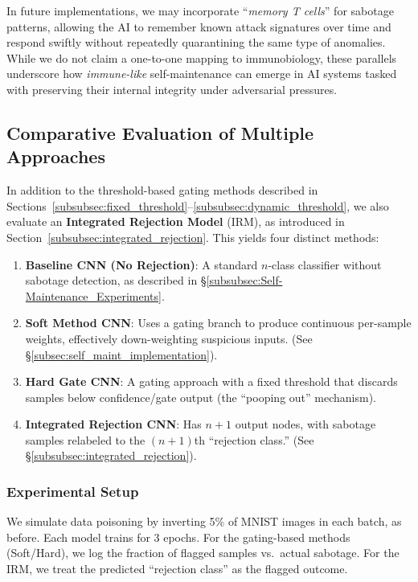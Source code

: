 \documentclass[12pt]{article}
\begin{document}
In future implementations, we may incorporate “\emph{memory T cells}” for sabotage
patterns, allowing the AI to remember known attack signatures over time and respond
swiftly without repeatedly quarantining the same type of anomalies. While we do not
claim a one-to-one mapping to immunobiology, these parallels underscore how
\emph{immune-like} self-maintenance can emerge in AI systems tasked with preserving
their internal integrity under adversarial pressures.

\subsection{Comparative Evaluation of Multiple Approaches}
\label{subsec:comparative_evaluation}

In addition to the threshold-based gating methods described in
Sections~\ref{subsubsec:fixed_threshold}--\ref{subsubsec:dynamic_threshold},
we also evaluate an \textbf{Integrated Rejection Model} (IRM),
as introduced in Section~\ref{subsubsec:integrated_rejection}. 
This yields four distinct methods:

\begin{enumerate}
    \item \textbf{Baseline CNN (No Rejection)}: A standard $n$-class classifier
          without sabotage detection, as described in \S\ref{subsubsec:Self-Maintenance_Experiments}.
    \item \textbf{Soft Method CNN}: Uses a gating branch to produce continuous
          per-sample weights, effectively down-weighting suspicious inputs.
          (See \S\ref{subsec:self_maint_implementation}).
    \item \textbf{Hard Gate CNN}: A gating approach with a fixed threshold that
          discards samples below confidence/gate output (the “pooping out” mechanism).
    \item \textbf{Integrated Rejection CNN}: Has $n+1$ output nodes, with sabotage
          samples relabeled to the $(n+1)$th “rejection class.” (See \S\ref{subsubsec:integrated_rejection}).
\end{enumerate}

\subsubsection{Experimental Setup}
\label{subsubsec:comp_setup}
We simulate data poisoning by inverting 5\% of MNIST images in each batch, as
before. Each model trains for 3 epochs. For the gating-based methods (Soft/Hard),
we log the fraction of flagged samples vs.\ actual sabotage. For the IRM, we
treat the predicted “rejection class” as the flagged outcome.
\end{document}
